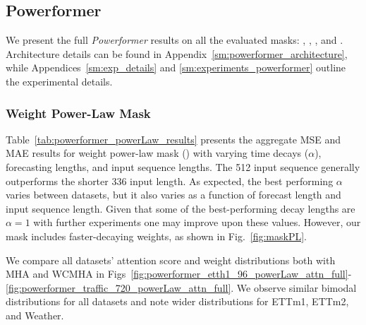 \subsection{Powerformer}
\label{sm:experiments_powerformer_results}

We present the full \emph{Powerformer} results on all the evaluated masks: \fpl, \fspl, \fbwo, and \fbwt.
Architecture details can be found in Appendix~\ref{sm:powerformer_architecture}, while Appendices~\ref{sm:exp_details} and \ref{sm:experiments_powerformer} outline the experimental details.



\subsubsection{Weight Power-Law Mask}
\label{sm:experiments_powerformer_simpowerLaw}
Table~\ref{tab:powerformer_powerLaw_results} presents the aggregate MSE and MAE results for weight power-law mask (\fpl) with varying time decays ($\alpha$), forecasting lengths, and input sequence lengths.
The 512 input sequence generally outperforms the shorter 336 input length.
As expected, the best performing $\alpha$ varies between datasets, but it also varies as a function of forecast length and input sequence length.
Given that some of the best-performing decay lengths are $\alpha=1$ with further experiments one may improve upon these values.
However, our \fspl{} mask includes faster-decaying weights, as shown in Fig.~\ref{fig:maskPL}.

We compare all datasets' attention score and weight distributions both with MHA and WCMHA in Figs~\ref{fig:powerformer_etth1_96_powerLaw_attn_full}-\ref{fig:powerformer_traffic_720_powerLaw_attn_full}.
We observe similar bimodal distributions for all datasets and note wider \weightCL{} distributions for ETTm1, ETTm2, and Weather.


